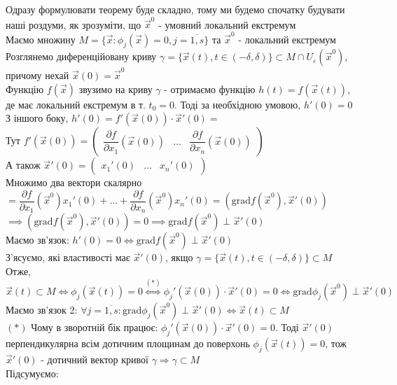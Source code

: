 \documentclass[a4paper, 10pt]{article}
\def\departial#1#2{\dfrac{\partial {#1}}{\partial {#2}}}
\def\bigline{\vspace{5mm}\\}
\theoremstyle{theoremdd}
\theoremstyle{theoremdd}
\theoremstyle{theoremdd}
\theoremstyle{theoremdd}
\theoremstyle{theoremdd}
\theoremstyle{theoremdd}
\theoremstyle{theoremdd}
\theoremstyle{theoremdd}
\begin{document}
Одразу формулювати теорему буде складно, тому ми будемо спочатку будувати наші роздуми, як зрозуміти, що $\vec{x}^0$ - умовний локальний екстремум
\bigline
Маємо множину $M=\{\vec{x}: \phi_j(\vec{x}) = 0, j=\overline{1,s} \}$ та $\vec{x}^0$ - локальний екстремум\\
Розглянемо диференційовану криву $\gamma = \{\vec{x}(t), t \in (-\delta, \delta )\} \subset M \cap U_{\varepsilon}(\vec{x}^0)$, причому нехай $\vec{x}(0) = \vec{x}^0$\\
Функцію $f(\vec{x})$ звузимо на криву $\gamma$ - отримаємо функцію $h(t) = f(\vec{x}(t))$, де має локальний екстремум в т. $t_0 = 0$. Тоді за необхідною умовою, $h'(0) = 0$\\
З іншого боку, $h'(0) = f'(\vec{x}(0)) \cdot \vec{x}'(0) \boxed{=}$\\
Тут $f'(\vec{x}(0)) = \begin{pmatrix}
\departial{f}{x_1}(\vec{x}(0)) & \dots & \departial{f}{x_n}(\vec{x}(0))
\end{pmatrix}$\\
А також $\vec{x}'(0) = \begin{pmatrix}
x_1'(0) & \dots & x_n'(0)
\end{pmatrix}$\\
Множимо два вектори скалярно\\
$\boxed{=} \departial{f}{x_1}(\vec{x}^0) x_1'(0) + \dots + \departial{f}{x_n}(\vec{x}^0) x_n'(0) = (\textrm{grad} f(\vec{x}^0), \vec{x}'(0))$\\
$\implies (\textrm{grad} f(\vec{x}^0), \vec{x}'(0)) = 0 \implies \textrm{grad} f(\vec{x}^0) \perp \vec{x}'(0)$\\
Маємо зв'язок: $h'(0) = 0 \iff \textrm{grad} f(\vec{x}^0) \perp \vec{x}'(0)$
\bigline
З'ясуємо, які властивості має $\vec{x}'(0)$, якщо $\gamma = \{\vec{x}(t), t \in (-\delta, \delta)\} \subset M$\\
Отже, $\vec{x}(t) \subset M \iff \phi_j(\vec{x}(t)) = 0 \overset{(*)}{\iff} \phi_j'(\vec{x}(0)) \cdot \vec{x}'(0) = 0 \iff  \textrm{grad} \phi_j(\vec{x}^0) \perp \vec{x}'(0)$\\
Маємо зв'язок 2: $\forall j=\overline{1,s}: \textrm{grad} \phi_j(\vec{x}^0) \perp \vec{x}'(0) \iff \vec{x}(t) \subset M$\\
$(*)$ Чому в зворотній бік працює: $\phi_j'(\vec{x}(0)) \cdot \vec{x}'(0) = 0$. Тоді $\vec{x}'(0)$ перпендикулярна всім дотичним площинам до поверхонь $\phi_j(\vec{x}(t)) = 0$, тож $\vec{x}'(0)$ - дотичний вектор кривої $\gamma \Rightarrow \gamma \subset M$
\bigline
Підсумуємо:\\
\end{document}
